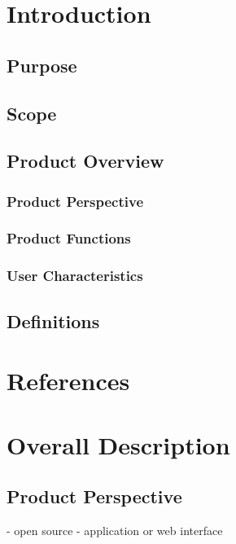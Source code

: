 \documentclass[10pt,draftclsnofoot,onecolumn]{IEEEtran}
\begin{document}
\title{}
\author{Alison Jones \& Parker Okonek}
\maketitle
\begin{abstract}
\end{abstract}
\newpage
\section{Introduction}
\subsection{Purpose}
\subsection{Scope}
\subsection{Product Overview}
\subsubsection{Product Perspective}
\subsubsection{Product Functions}
\subsubsection{User Characteristics}
\subsection{Definitions}

\section{References}

\section{Overall Description}
\subsection{Product Perspective}
- open source
- application or web interface
\end{document}

